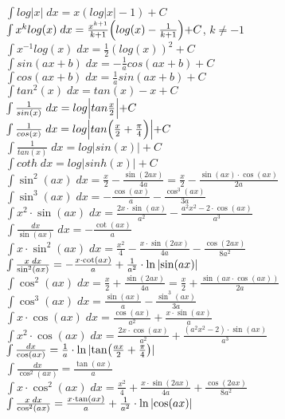 ${\int log|x|\;dx= x(log|x|-1)+C}$\\
${\int x^k log(x)\;dx=\frac{x^{k+1}}{k+1}\Bigl(log(x)-\frac{1}{k+1}\Bigl)+C}$, $k\neq -1$\\
${\int x^{-1}log(x)\;dx= \frac{1}{2}(log(x))^2 + C}$\\
${\int sin(ax+b)\;dx=-\frac{1}{a}cos(ax+b)+C}$\\
${\int cos(ax+b)\;dx=\frac{1}{a}sin(ax+b)+C}$\\
${\int tan^2(x)\;dx= tan(x)-x+C}$\\
${\int \frac{1}{sin(x)}\;dx=log\Bigl|tan\frac{x}{2}\Bigl|+C}$\\
${\int \frac{1}{cos(x)}\;dx=log\Bigl|tan\Bigl(\frac{x}{2}+\frac{\pi}{4}\Bigl)\Bigl|+C}$\\
${\int \frac{1}{tan(x)}\;dx=log|sin(x)|+C}$\\
${\int coth\;dx=log|sinh(x)|+C}$\\
$\int \sin^2(ax)\;dx= \frac{x}{2}- \frac{\sin(2ax)}{4a} = \frac{x}{2} - \frac{\sin(ax) \cdot \cos(ax)}{2a}$\\
$\int \sin^3(ax)\;dx= - \frac{\cos(ax)}{a}- \frac{\cos^3(ax)}{3a}$\\
$\int x^2 \cdot \sin(ax)\;dx = \frac{2x \cdot \sin(ax)}{a^2} - \frac{a^2x^2-2 \cdot \cos(ax)}{a^3}$\\
$\int \frac{dx}{\sin(ax)}\;dx = - \frac{\cot(ax)}{a}$\\
$\int x \cdot \sin^2(ax)\;dx = \frac{x^2}{4} - \frac{x \cdot \sin(2ax)}{4a} - \frac{\cos(2ax)}{8a^2}$\\
$\int \frac{x \;dx}{\sin^2(ax)} = -\frac{x \cdot \cot(ax)}{a} + \frac{1}{a^2} \cdot \ln \abs*{\sin(ax)}$\\
$\int \cos^2(ax) \;dx = \frac{x}{2} + \frac{\sin(2ax)}{4a} = \frac{x}{2} + \frac{\sin(ax \cdot \cos(ax))}{2a}$\\
$\int \cos^3(ax) \;dx = \frac{\sin(ax)}{a} - \frac{\sin^3(ax)}{3a}$\\
$\int x \cdot \cos(ax) \;dx = \frac{\cos(ax)}{a^2} + \frac{x \cdot \sin(ax)}{a}$\\
$\int x^2 \cdot \cos(ax) \;dx = \frac{2x \cdot \cos(ax)}{a^2} + \frac{(a^2x^2 - 2) \cdot \sin(ax)}{a^3}$\\
$\int \frac{dx}{\cos(ax)} = \frac{1}{a} \cdot \ln \abs*{\tan(\frac{ax}{2} + \frac{\pi}{4})}$\\
$\int \frac{dx}{\cos^2(ax)} = \frac{\tan(ax)}{a}$\\
$\int x \cdot \cos^2(ax) \;dx = \frac{x^2}{4} + \frac{x \cdot \sin(2ax)}{4a} + \frac{\cos(2ax)}{8a^2}$\\
$\int \frac{x \;dx}{\cos^2(ax)} = \frac{x \cdot \tan(ax)}{a} + \frac{1}{a^2} \cdot \ln \abs*{\cos(ax)}$\\


